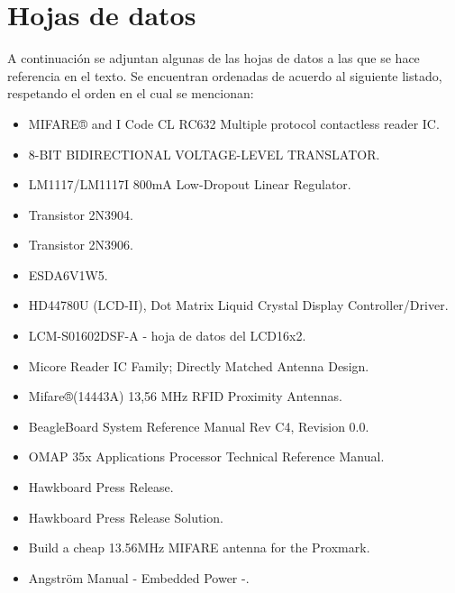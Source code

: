 \chapter{Hojas de datos}\label{HD}

A continuación se adjuntan algunas de las hojas de datos a las que se hace referencia en el texto.
Se encuentran ordenadas de acuerdo al siguiente listado, respetando el orden en el cual se mencionan:

\begin{itemize}
\item MIFARE® and I Code CL RC632 Multiple protocol contactless reader IC.
\item 8-BIT BIDIRECTIONAL VOLTAGE-LEVEL TRANSLATOR.
\item LM1117/LM1117I 800mA Low-Dropout Linear Regulator.
\item Transistor 2N3904.
\item Transistor 2N3906.
\item ESDA6V1W5.
\item HD44780U (LCD-II), Dot Matrix Liquid Crystal Display Controller/Driver.
\item LCM-S01602DSF-A - hoja de datos del LCD16x2.
\item Micore Reader IC Family; Directly Matched Antenna Design.
\item Mifare®(14443A) 13,56 MHz RFID Proximity Antennas.
\item BeagleBoard System Reference Manual Rev C4, Revision 0.0.
\item OMAP 35x Applications Processor Technical Reference Manual.
\item Hawkboard Press Release.
\item Hawkboard Press Release Solution.
\item Build a cheap 13.56MHz MIFARE antenna for the Proxmark.
\item Angström Manual - Embedded Power -.
\end{itemize}

